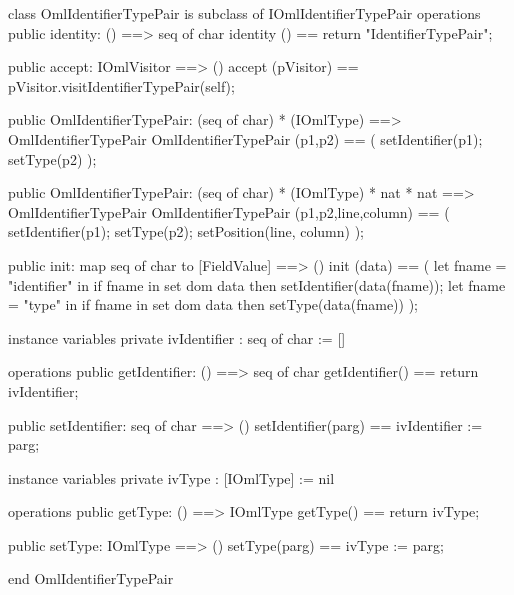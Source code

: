 \begin{vdm_al}
class OmlIdentifierTypePair is subclass of IOmlIdentifierTypePair
operations
  public identity: () ==> seq of char
  identity () == return "IdentifierTypePair";

  public accept: IOmlVisitor ==> ()
  accept (pVisitor) == pVisitor.visitIdentifierTypePair(self);

  public OmlIdentifierTypePair:
    (seq of char) *
    (IOmlType) ==> OmlIdentifierTypePair
  OmlIdentifierTypePair (p1,p2) == 
    ( setIdentifier(p1);
      setType(p2) );

  public OmlIdentifierTypePair:
    (seq of char) *
    (IOmlType) *
    nat *
    nat ==> OmlIdentifierTypePair
  OmlIdentifierTypePair (p1,p2,line,column) == 
    ( setIdentifier(p1);
      setType(p2);
      setPosition(line, column) );

  public init: map seq of char to [FieldValue] ==> ()
  init (data) ==
    ( let fname = "identifier" in
        if fname in set dom data
        then setIdentifier(data(fname));
      let fname = "type" in
        if fname in set dom data
        then setType(data(fname)) );

instance variables
  private ivIdentifier : seq of char := []

operations
  public getIdentifier: () ==> seq of char
  getIdentifier() == return ivIdentifier;

  public setIdentifier: seq of char ==> ()
  setIdentifier(parg) == ivIdentifier := parg;

instance variables
  private ivType : [IOmlType] := nil

operations
  public getType: () ==> IOmlType
  getType() == return ivType;

  public setType: IOmlType ==> ()
  setType(parg) == ivType := parg;

end OmlIdentifierTypePair
\end{vdm_al}

